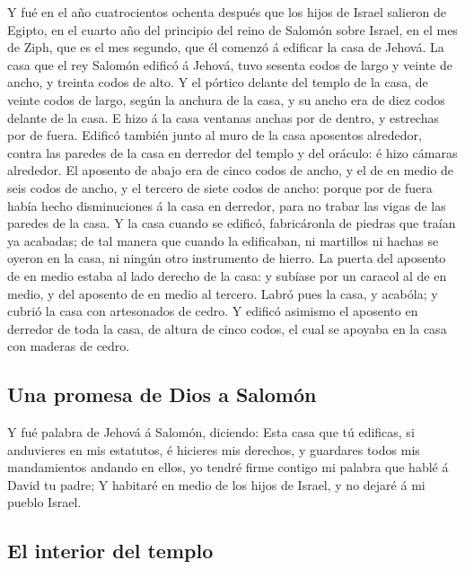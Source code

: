  Y fué en el año cuatrocientos ochenta después que los hijos
de Israel salieron de Egipto, en el cuarto año del principio del reino
de Salomón sobre Israel, en el mes de Ziph, que es el mes segundo, que
él comenzó á edificar la casa de Jehová.  La casa que el rey
Salomón edificó á Jehová, tuvo sesenta codos de largo y veinte de ancho,
y treinta codos de alto.  Y el pórtico delante del templo de
la casa, de veinte codos de largo, según la anchura de la casa, y su
ancho era de diez codos delante de la casa.  E hizo á la
casa ventanas anchas por de dentro, y estrechas por de fuera.
 Edificó también junto al muro de la casa aposentos
alrededor, contra las paredes de la casa en derredor del templo y del
oráculo: é hizo cámaras alrededor.  El aposento de abajo era
de cinco codos de ancho, y el de en medio de seis codos de ancho, y el
tercero de siete codos de ancho: porque por de fuera había hecho
disminuciones á la casa en derredor, para no trabar las vigas de las
paredes de la casa.  Y la casa cuando se edificó,
fabricáronla de piedras que traían ya acabadas; de tal manera que cuando
la edificaban, ni martillos ni hachas se oyeron en la casa, ni ningún
otro instrumento de hierro.  La puerta del aposento de en
medio estaba al lado derecho de la casa: y subíase por un caracol al de
en medio, y del aposento de en medio al tercero.  Labró pues
la casa, y acabóla; y cubrió la casa con artesonados de cedro.
 Y edificó asimismo el aposento en derredor de toda la
casa, de altura de cinco codos, el cual se apoyaba en la casa con
maderas de cedro.

\hypertarget{una-promesa-de-dios-a-salomuxf3n}{%
\subsection{Una promesa de Dios a
Salomón}\label{una-promesa-de-dios-a-salomuxf3n}}

 Y fué palabra de Jehová á Salomón, diciendo: 
Esta casa que tú edificas, si anduvieres en mis estatutos, é hicieres
mis derechos, y guardares todos mis mandamientos andando en ellos, yo
tendré firme contigo mi palabra que hablé á David tu padre;
 Y habitaré en medio de los hijos de Israel, y no dejaré á
mi pueblo Israel.

\hypertarget{el-interior-del-templo}{%
\subsection{El interior del templo}\label{el-interior-del-templo}}

